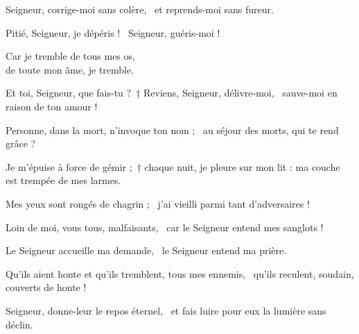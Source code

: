 \item Seigneur, corrige-moi sans colère,~\psstar{} et reprends-moi sans fureur.

\item Pitié, Seigneur, je dépéris !~\psstar{} Seigneur, guéris-moi !

\item Car je tremble de tous mes os,~\psstar{} \\de toute mon âme, je tremble.

\item Et toi, Seigneur, que fais-tu ?~† Reviens, Seigneur, délivre-moi,~\psstar{} sauve-moi en raison de ton amour !

\item Personne, dans la mort, n'invoque ton nom ;~\psstar{} au séjour des morts, qui te rend grâce ?

\item Je m'épuise à force de gémir ;~† chaque nuit, je pleure sur mon lit : ma couche est trempée de mes larmes.

\item Mes yeux sont rongés de chagrin ;~\psstar{} j'ai vieilli parmi tant d'adversaires !

\item Loin de moi, vous tous, malfaisants,~\psstar{} car le Seigneur entend mes sanglots !

\item Le Seigneur accueille ma demande,~\psstar{} le Seigneur entend ma prière.

\item Qu'ils aient honte et qu'ils tremblent, tous mes ennemis,~\psstar{} qu'ils reculent, soudain, couverts de honte !

\item Seigneur, donne-leur le repos éternel,~\psstar{} et fais luire pour eux la lumière sans déclin.